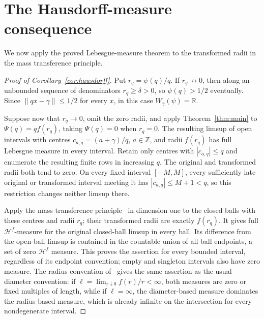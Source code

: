 \section{The Hausdorff-measure consequence}
\label{sec:consequences}

We now apply the proved Lebesgue-measure theorem to the transformed
radii in the mass transference principle.

\begin{proof}[Proof of Corollary~\ref{cor:hausdorff}]
Put $r_q=\psi(q)/q$. If $r_q\not\to0$, then along an unbounded
sequence of denominators $r_q\ge\delta>0$, so $\psi(q)>1/2$
eventually. Since $\|qx-\gamma\|\le1/2$ for every $x$, in this
case $W_\gamma(\psi)=\mathbb R$.

Suppose now that $r_q\to0$, omit the zero radii, and apply
Theorem~\ref{thm:main} to $\Psi(q)=qf(r_q)$, taking $\Psi(q)=0$
when $r_q=0$. The resulting limsup of open intervals with centres
$c_{a,q}=(a+\gamma)/q$, $a\in\mathbb Z$, and radii $f(r_q)$ has
full Lebesgue measure in every interval.
Retain only centres with $|c_{a,q}|\le q$ and enumerate the resulting
finite rows in increasing $q$. The original and transformed radii
both tend to zero. On every fixed interval $[-M,M]$, every sufficiently
late original or transformed interval meeting it has
$|c_{a,q}|\le M+1<q$, so this restriction changes neither limsup there.

Apply the mass transference principle~\cite[Theorem~2]{BV2006} in
dimension one to the closed balls with these centres and radii $r_q$;
their transformed radii are exactly $f(r_q)$. It gives full
$\mathcal H^f$-measure for the original closed-ball limsup in every
ball. Its difference from the open-ball limsup is contained in the
countable union of all ball endpoints, a set of zero $\mathcal H^f$
measure. This proves the assertion for every bounded interval,
regardless of its endpoint convention; empty and singleton intervals
also have zero measure. The radius convention of~\cite{BV2006}
gives the same assertion as the usual diameter convention: if
$\ell=\lim_{r\downarrow0}f(r)/r<\infty$, both measures are zero or
fixed multiples of length, while if $\ell=\infty$, the
diameter-based measure dominates the radius-based measure, which is
already infinite on the intersection for every nondegenerate interval.
\end{proof}
